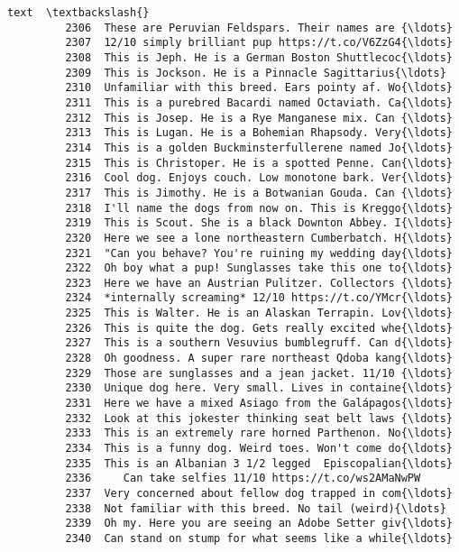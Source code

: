 \documentclass[11pt]{article}
\begin{document}
\begin{Verbatim}[commandchars=\\\{\}]
                                                            text  \textbackslash{}
         2306  These are Peruvian Feldspars. Their names are {\ldots}   
         2307  12/10 simply brilliant pup https://t.co/V6ZzG4{\ldots}   
         2308  This is Jeph. He is a German Boston Shuttlecoc{\ldots}   
         2309  This is Jockson. He is a Pinnacle Sagittarius{\ldots}   
         2310  Unfamiliar with this breed. Ears pointy af. Wo{\ldots}   
         2311  This is a purebred Bacardi named Octaviath. Ca{\ldots}   
         2312  This is Josep. He is a Rye Manganese mix. Can {\ldots}   
         2313  This is Lugan. He is a Bohemian Rhapsody. Very{\ldots}   
         2314  This is a golden Buckminsterfullerene named Jo{\ldots}   
         2315  This is Christoper. He is a spotted Penne. Can{\ldots}   
         2316  Cool dog. Enjoys couch. Low monotone bark. Ver{\ldots}   
         2317  This is Jimothy. He is a Botwanian Gouda. Can {\ldots}   
         2318  I'll name the dogs from now on. This is Kreggo{\ldots}   
         2319  This is Scout. She is a black Downton Abbey. I{\ldots}   
         2320  Here we see a lone northeastern Cumberbatch. H{\ldots}   
         2321  "Can you behave? You're ruining my wedding day{\ldots}   
         2322  Oh boy what a pup! Sunglasses take this one to{\ldots}   
         2323  Here we have an Austrian Pulitzer. Collectors {\ldots}   
         2324  *internally screaming* 12/10 https://t.co/YMcr{\ldots}   
         2325  This is Walter. He is an Alaskan Terrapin. Lov{\ldots}   
         2326  This is quite the dog. Gets really excited whe{\ldots}   
         2327  This is a southern Vesuvius bumblegruff. Can d{\ldots}   
         2328  Oh goodness. A super rare northeast Qdoba kang{\ldots}   
         2329  Those are sunglasses and a jean jacket. 11/10 {\ldots}   
         2330  Unique dog here. Very small. Lives in containe{\ldots}   
         2331  Here we have a mixed Asiago from the Galápagos{\ldots}   
         2332  Look at this jokester thinking seat belt laws {\ldots}   
         2333  This is an extremely rare horned Parthenon. No{\ldots}   
         2334  This is a funny dog. Weird toes. Won't come do{\ldots}   
         2335  This is an Albanian 3 1/2 legged  Episcopalian{\ldots}   
         2336     Can take selfies 11/10 https://t.co/ws2AMaNwPW   
         2337  Very concerned about fellow dog trapped in com{\ldots}   
         2338  Not familiar with this breed. No tail (weird){\ldots}   
         2339  Oh my. Here you are seeing an Adobe Setter giv{\ldots}   
         2340  Can stand on stump for what seems like a while{\ldots}   

\end{Verbatim}
\end{document}
